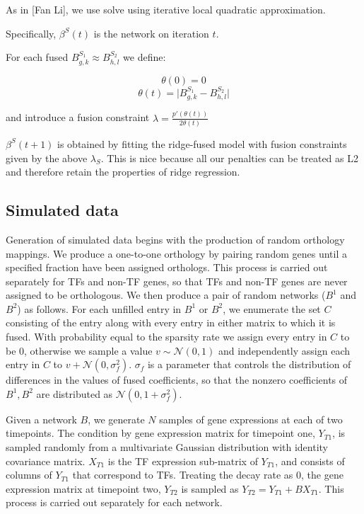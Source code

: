 \documentclass[11pt]{article}
\begin{document}
As in [Fan Li], we use solve using iterative local quadratic approximation. 

Specifically, $\beta^S(t)$ is the network on iteration $t$. 

For each fused $B^{S_1}_{g,k} \approx B^{S_2}_{h,l}$ we define:

\begin{equation} 
\theta(0)=0
\end{equation}
\begin{equation}
\theta(t) = \vert B^{S_1}_{g,k} - B^{S_2}_{h,l} \vert
\end{equation}

and introduce a fusion constraint $\lambda = \frac{p'(\theta(t))}{2\theta(t)} $

$\beta^S(t+1)$ is obtained by fitting the ridge-fused model with fusion constraints given by the above $\lambda_S$. This is nice because all our penalties can be treated as L2 and therefore retain the properties of ridge regression. 



\subsection{Simulated data}
Generation of simulated data begins with the production of random orthology mappings. We produce a one-to-one orthology by pairing random genes until a specified fraction have been assigned orthologs. This process is carried out separately for TFs and non-TF genes, so that TFs and non-TF genes are never assigned to be orthologous. We then produce a pair of random networks ($B^1$ and $B^2$) as follows. For each unfilled entry in $B^1$ or $B^2$, we enumerate the set $C$ consisting of the entry along with every entry in either matrix to which it is fused. With probability equal to the sparsity rate we assign every entry in $C$ to be 0, otherwise we sample a value $v \sim \mathcal{N}(0,1)$ and independently assign each entry in $C$ to $v + \mathcal{N}(0, \sigma_f^2)$. $\sigma_f$ is a parameter that controls the distribution of differences in the values of fused coefficients, so that the nonzero coefficients of $B^1, B^2$ are distributed as $\mathcal{N}(0, 1 + \sigma_f^2)$.

Given a network $B$, we generate $N$ samples of gene expressions at each of two timepoints. The condition by gene expression matrix for timepoint one, $Y_{T1}$, is sampled randomly from a multivariate Gaussian distribution with identity covariance matrix. $X_{T1}$ is the TF expression sub-matrix of $Y_{T1}$, and consists of columns of $Y_{T1}$ that correspond to TFs. Treating the decay rate as 0, the gene expression matrix at timepoint two, $Y_{T2}$ is sampled as $Y_{T2} = Y_{T1} + BX_{T1}$. This process is carried out separately for each network. 
\end{document}

